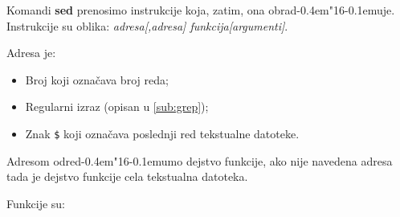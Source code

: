 \documentclass[12pt,a4paper,titlepage]{article}
\def\d{d\kern-0.4em\char"16\kern-0.1em}
\begin{document}
      Komandi {\bf sed} prenosimo instrukcije koja, zatim, ona obra\d uje.
      Instrukcije su oblika: {\it adresa[,adresa] funkcija[argumenti]}.

      Adresa je:
      \begin{itemize}
      \item
        Broj koji ozna\v cava broj reda;
      \item
        Regularni izraz (opisan u \ref{sub:grep});
      \item
        Znak {\tt\$} koji ozna\v cava poslednji red tekstualne datoteke.
      \end{itemize}

      Adresom odre\d umo dejstvo funkcije, ako nije navedena adresa tada je
      dejstvo funkcije cela tekstualna datoteka.

      Funkcije su:
\end{document}
